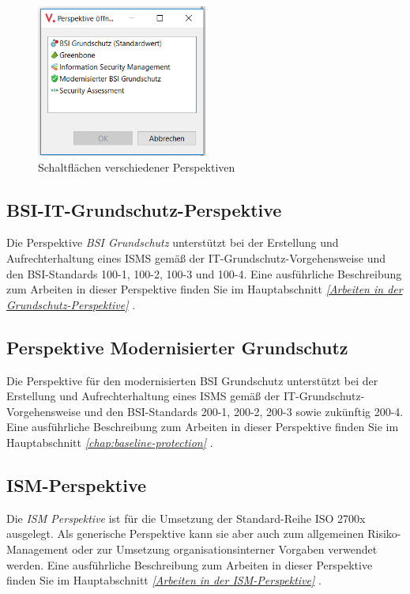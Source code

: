 \documentclass[a4paper,10pt]{book}
\begin{document}
\begin{figure}[htb!]
  \centering
  \includegraphics[width=0.5\textwidth]{Screenshot/persp}
  \caption{Schaltflächen verschiedener Perspektiven}
  \label{fig:window_persp}
\end{figure}

\subsection{BSI-IT-Grundschutz-Perspektive}
Die Perspektive {\em BSI Grundschutz} unterstützt bei der Erstellung und Aufrechterhaltung eines ISMS gemäß der IT-Grundschutz-Vorgehensweise
und den BSI-Standards 100-1, 100-2, 100-3 und 100-4. Eine ausführliche Beschreibung zum Arbeiten
in dieser Perspektive finden Sie im
Hauptabschnitt {\em \ref{Arbeiten in der Grundschutz-Perspektive} }.

\subsection{Perspektive Modernisierter Grundschutz}
Die Perspektive für den modernisierten BSI Grundschutz unterstützt bei der
Erstellung und Aufrechterhaltung eines ISMS gemäß der
IT-Grundschutz-Vorgehensweise und den BSI-Standards 200-1, 200-2, 200-3 sowie
zukünftig 200-4. Eine ausführliche Beschreibung zum Arbeiten in dieser
Perspektive finden Sie im Hauptabschnitt \emph{\ref{chap:baseline-protection} }.

\subsection{ISM-Perspektive}
Die {\em ISM Perspektive} ist für die Umsetzung der Standard-Reihe ISO 2700x ausgelegt. Als generische Perspektive kann sie aber auch zum
allgemeinen Risiko-Management oder zur Umsetzung organisationsinterner Vorgaben verwendet werden. Eine ausführliche Beschreibung zum
Arbeiten in dieser Perspektive finden Sie im Hauptabschnitt {\em \ref{Arbeiten in der ISM-Perspektive} }.
\end{document}
